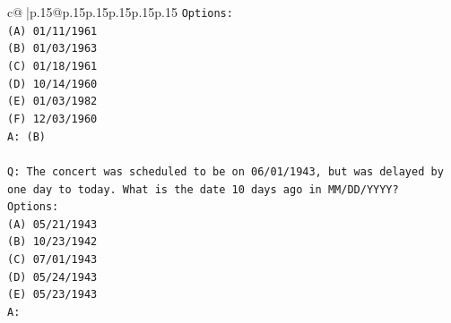 \documentclass{article}
\begin{document}
{\begin{supertabular}{c@{$\;$}|p{.15\linewidth}@{}p{.15\linewidth}p{.15\linewidth}p{.15\linewidth}p{.15\linewidth}p{.15\linewidth}}
{{{\texttt{Options:} \\
\texttt{(A) 01/11/1961} \\
\texttt{(B) 01/03/1963} \\
\texttt{(C) 01/18/1961} \\
\texttt{(D) 10/14/1960} \\
\texttt{(E) 01/03/1982} \\
\texttt{(F) 12/03/1960} \\
\texttt{A: (B)} \\
\\ 
\texttt{Q: The concert was scheduled to be on 06/01/1943, but was delayed by one day to today. What is the date 10 days ago in MM/DD/YYYY?} \\
\texttt{Options:} \\
\texttt{(A) 05/21/1943} \\
\texttt{(B) 10/23/1942} \\
\texttt{(C) 07/01/1943} \\
\texttt{(D) 05/24/1943} \\
\texttt{(E) 05/23/1943} \\
\texttt{A:} \\
            }
        }
    }
     \\ \\


\end{supertabular}}
\end{document}
